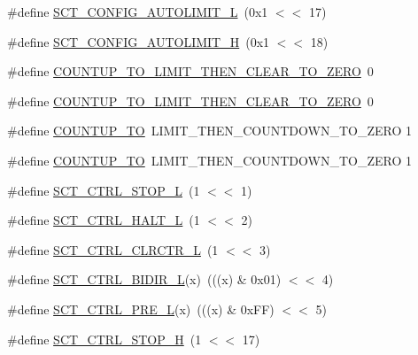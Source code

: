\begin{DoxyCompactItemize}
\item 
\#define \hyperlink{group___s_c_t__18_x_x__43_x_x_gac727f3a2843844006cad343e832f2986}{S\+C\+T\+\_\+\+C\+O\+N\+F\+I\+G\+\_\+\+A\+U\+T\+O\+L\+I\+M\+I\+T\+\_\+L}~(0x1 $<$$<$ 17)
\item 
\#define \hyperlink{group___s_c_t__18_x_x__43_x_x_gade673779ab8ecd446b29251467328b6e}{S\+C\+T\+\_\+\+C\+O\+N\+F\+I\+G\+\_\+\+A\+U\+T\+O\+L\+I\+M\+I\+T\+\_\+H}~(0x1 $<$$<$ 18)
\item 
\#define \hyperlink{group___s_c_t__18_x_x__43_x_x_gae031b8fdb62fadf5d4a61e5d633200d6}{C\+O\+U\+N\+T\+U\+P\+\_\+\+T\+O\+\_\+\+L\+I\+M\+I\+T\+\_\+\+T\+H\+E\+N\+\_\+\+C\+L\+E\+A\+R\+\_\+\+T\+O\+\_\+\+Z\+E\+RO}~0
\item 
\#define \hyperlink{group___s_c_t__18_x_x__43_x_x_gae031b8fdb62fadf5d4a61e5d633200d6}{C\+O\+U\+N\+T\+U\+P\+\_\+\+T\+O\+\_\+\+L\+I\+M\+I\+T\+\_\+\+T\+H\+E\+N\+\_\+\+C\+L\+E\+A\+R\+\_\+\+T\+O\+\_\+\+Z\+E\+RO}~0
\item 
\#define \hyperlink{group___s_c_t__18_x_x__43_x_x_ga06ed56286d35da0efb487ae76663f40a}{C\+O\+U\+N\+T\+U\+P\+\_\+\+TO}~L\+I\+M\+I\+T\+\_\+\+T\+H\+E\+N\+\_\+\+C\+O\+U\+N\+T\+D\+O\+W\+N\+\_\+\+T\+O\+\_\+\+Z\+E\+RO 1
\item 
\#define \hyperlink{group___s_c_t__18_x_x__43_x_x_ga06ed56286d35da0efb487ae76663f40a}{C\+O\+U\+N\+T\+U\+P\+\_\+\+TO}~L\+I\+M\+I\+T\+\_\+\+T\+H\+E\+N\+\_\+\+C\+O\+U\+N\+T\+D\+O\+W\+N\+\_\+\+T\+O\+\_\+\+Z\+E\+RO 1
\item 
\#define \hyperlink{group___s_c_t__18_x_x__43_x_x_ga630d5421762974f255537a14d391b0be}{S\+C\+T\+\_\+\+C\+T\+R\+L\+\_\+\+S\+T\+O\+P\+\_\+L}~(1 $<$$<$ 1)
\item 
\#define \hyperlink{group___s_c_t__18_x_x__43_x_x_ga40704e7d46713ea4b4c84e07a80a482e}{S\+C\+T\+\_\+\+C\+T\+R\+L\+\_\+\+H\+A\+L\+T\+\_\+L}~(1 $<$$<$ 2)
\item 
\#define \hyperlink{group___s_c_t__18_x_x__43_x_x_ga75edacff186a48ac4193bf5069e03fba}{S\+C\+T\+\_\+\+C\+T\+R\+L\+\_\+\+C\+L\+R\+C\+T\+R\+\_\+L}~(1 $<$$<$ 3)
\item 
\#define \hyperlink{group___s_c_t__18_x_x__43_x_x_ga8cf518b4240ce7d11e5bf552a49f7092}{S\+C\+T\+\_\+\+C\+T\+R\+L\+\_\+\+B\+I\+D\+I\+R\+\_\+L}(x)~(((x) \& 0x01) $<$$<$ 4)
\item 
\#define \hyperlink{group___s_c_t__18_x_x__43_x_x_gac781c2ccd9053038834cebc3f0ea6ec6}{S\+C\+T\+\_\+\+C\+T\+R\+L\+\_\+\+P\+R\+E\+\_\+L}(x)~(((x) \& 0x\+F\+F) $<$$<$ 5)
\item 
\#define \hyperlink{group___s_c_t__18_x_x__43_x_x_gae0f0598ff2c22b1db06e3590c03280ea}{S\+C\+T\+\_\+\+C\+T\+R\+L\+\_\+\+S\+T\+O\+P\+\_\+H}~(1 $<$$<$ 17)

\end{DoxyCompactItemize}
